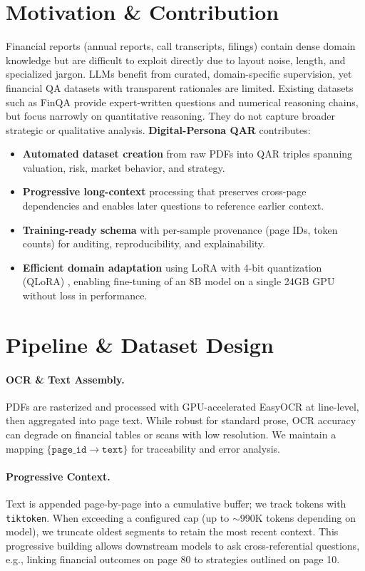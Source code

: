 \documentclass[sigconf,authordraft,anonymous]{acmart}
\begin{document}
\section{Motivation \& Contribution}
Financial reports (annual reports, call transcripts, filings) contain dense domain knowledge but are difficult to exploit directly due to layout noise, length, and specialized jargon. LLMs benefit from curated, domain-specific supervision, yet financial QA datasets with transparent rationales are limited. Existing datasets such as FinQA \cite{chen2022finqadatasetnumericalreasoning} provide expert-written questions and numerical reasoning chains, but focus narrowly on quantitative reasoning. They do not capture broader strategic or qualitative analysis. \textbf{Digital-Persona QAR} contributes:
\begin{itemize}
  \item \textbf{Automated dataset creation} from raw PDFs into QAR triples spanning valuation, risk, market behavior, and strategy.
  \item \textbf{Progressive long-context} processing that preserves cross-page dependencies and enables later questions to reference earlier context.
  \item \textbf{Training-ready schema} with per-sample provenance (page IDs, token counts) for auditing, reproducibility, and explainability.
  \item \textbf{Efficient domain adaptation} using LoRA with 4-bit quantization (QLoRA) \cite{dettmers2023qloraefficientfinetuningquantized}, enabling fine-tuning of an 8B model on a single 24GB GPU without loss in performance.
\end{itemize}

\section{Pipeline \& Dataset Design}
\paragraph{OCR \& Text Assembly.}
PDFs are rasterized and processed with GPU-accelerated EasyOCR at line-level, then aggregated into page text. While robust for standard prose, OCR accuracy can degrade on financial tables or scans with low resolution. We maintain a mapping $\{\texttt{page\_id} \rightarrow \texttt{text}\}$ for traceability and error analysis.

\paragraph{Progressive Context.}
Text is appended page-by-page into a cumulative buffer; we track tokens with \texttt{tiktoken}. When exceeding a configured cap (up to $\sim$990K tokens depending on model), we truncate oldest segments to retain the most recent context. This progressive building allows downstream models to ask cross-referential questions, e.g., linking financial outcomes on page 80 to strategies outlined on page 10.
\end{document}
